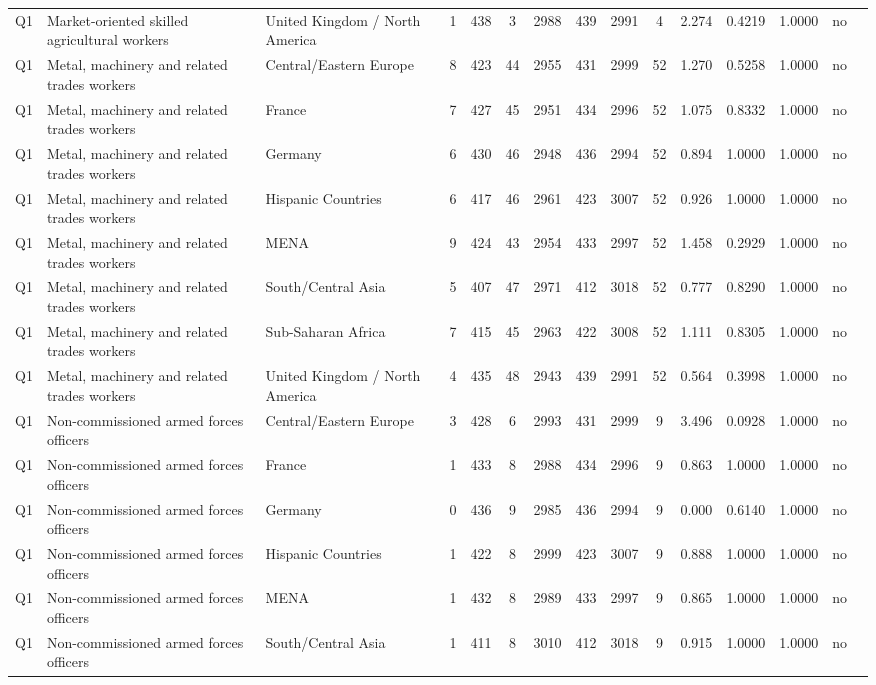 \begin{longtable}{lllrcccccccccll}
Q1 & Market-oriented skilled agricultural workers & United Kingdom / North America & 1 & 438 & 3 & 2988 & 439 & 2991 & 4 & 2.274 & 0.4219 & 1.0000 & no \\
Q1 & Metal, machinery and related trades workers & Central/Eastern Europe & 8 & 423 & 44 & 2955 & 431 & 2999 & 52 & 1.270 & 0.5258 & 1.0000 & no \\
Q1 & Metal, machinery and related trades workers & France & 7 & 427 & 45 & 2951 & 434 & 2996 & 52 & 1.075 & 0.8332 & 1.0000 & no \\
Q1 & Metal, machinery and related trades workers & Germany & 6 & 430 & 46 & 2948 & 436 & 2994 & 52 & 0.894 & 1.0000 & 1.0000 & no \\
Q1 & Metal, machinery and related trades workers & Hispanic Countries & 6 & 417 & 46 & 2961 & 423 & 3007 & 52 & 0.926 & 1.0000 & 1.0000 & no \\
Q1 & Metal, machinery and related trades workers & MENA & 9 & 424 & 43 & 2954 & 433 & 2997 & 52 & 1.458 & 0.2929 & 1.0000 & no \\
Q1 & Metal, machinery and related trades workers & South/Central Asia & 5 & 407 & 47 & 2971 & 412 & 3018 & 52 & 0.777 & 0.8290 & 1.0000 & no \\
Q1 & Metal, machinery and related trades workers & Sub-Saharan Africa & 7 & 415 & 45 & 2963 & 422 & 3008 & 52 & 1.111 & 0.8305 & 1.0000 & no \\
Q1 & Metal, machinery and related trades workers & United Kingdom / North America & 4 & 435 & 48 & 2943 & 439 & 2991 & 52 & 0.564 & 0.3998 & 1.0000 & no \\
Q1 & Non-commissioned armed forces officers & Central/Eastern Europe & 3 & 428 & 6 & 2993 & 431 & 2999 & 9 & 3.496 & 0.0928 & 1.0000 & no \\
Q1 & Non-commissioned armed forces officers & France & 1 & 433 & 8 & 2988 & 434 & 2996 & 9 & 0.863 & 1.0000 & 1.0000 & no \\
Q1 & Non-commissioned armed forces officers & Germany & 0 & 436 & 9 & 2985 & 436 & 2994 & 9 & 0.000 & 0.6140 & 1.0000 & no \\
Q1 & Non-commissioned armed forces officers & Hispanic Countries & 1 & 422 & 8 & 2999 & 423 & 3007 & 9 & 0.888 & 1.0000 & 1.0000 & no \\
Q1 & Non-commissioned armed forces officers & MENA & 1 & 432 & 8 & 2989 & 433 & 2997 & 9 & 0.865 & 1.0000 & 1.0000 & no \\
Q1 & Non-commissioned armed forces officers & South/Central Asia & 1 & 411 & 8 & 3010 & 412 & 3018 & 9 & 0.915 & 1.0000 & 1.0000 & no \\

\end{longtable}
